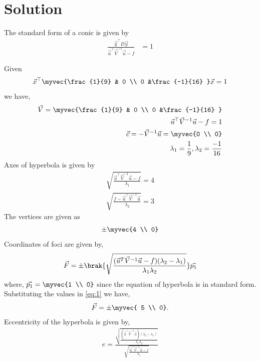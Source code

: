 \documentclass[journal,12pt,twocolumn]{IEEEtran}
\begin{document}
\section{Solution}
\begin{lemma}
The standard form of a conic is given by
\begin{align}
\frac{\vec{y}^{\top}D\vec{y}}{\vec{u}^{\top}\vec{V}^{-1}\vec{u}-f}&=1
\end{align}
\end{lemma}
Given
\begin{align}
\vec{x}^{\top}\myvec{\frac{1}{9} & 0 \\ 0 &\frac{-1}{16} }\vec{x}=1  
\end{align}
we have,
\begin{align}
    \vec{V} = \myvec{\frac{1}{9} & 0 \\ 0 &\frac{-1}{16} }
    \\
    \vec{u}^{\top}\vec{V}^{-1}\vec{u}-f = 1
    \\
    \vec{c} = -\vec{V}^{-1}\vec{u}=\myvec{0 \\ 0}
    \\
    \lambda_1 =  \frac{1}{9}, \lambda_2 = \frac{-1}{16}
\end{align}
Axes of hyperbola is given by
\begin{align}
    \sqrt{\frac{\vec{u}^{\top}\vec{V}^{-1}\vec{u}-f}{\lambda_1}} = 4\\ \sqrt{\frac{f-\vec{u}^{\top}\vec{V}^{-1}\vec{u}}{\lambda_2}} = 3
\end{align}
The vertices are given as
\begin{align}
    \pm\myvec{4 \\ 0}
\end{align}
Coordinates of foci are given by,
\begin{align}
  \vec{F} =\pm\brak{\sqrt{\frac{(\vec{u}^T\vec{V}^{-1}\vec{u}-f)(\lambda_2-\lambda_1)}{\lambda_1\lambda_2}}}\vec{p_1} \label{eq:1}
\end{align}
where, $\vec{p_1} = \myvec{1 \\ 0}$ since the equation of hyperbola is in standard form.
Substituting the values in \eqref{eq:1} we have,
\begin{align}
    \vec{F} = \pm\myvec{ 5 \\ 0}.
\end{align}
Eccentricity of the hyperbola is given by,
\begin{align}
   e = \frac{\sqrt{\frac{(\vec{u}^{\top}\vec{V}^{-1}\vec{u})(\lambda_2-\lambda_1)}{\lambda_1\lambda_2}}}{\sqrt{\frac{\vec{u}^{\top}\vec{V}^{-1}\vec{u}-f}{\lambda_1}}} \label{eq:2}
\end{align}
\end{document}
